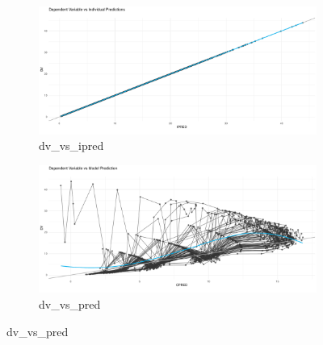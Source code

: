 \begin{figure}[htbp]
    \begin{subfigure}[b]{0.45\linewidth}
        \centering
        \includegraphics[width=\linewidth]{fig/img/Xpose/dv_vs_ipred.pdf}
        \caption{dv\_vs\_ipred}
        \label{fig:dv_vs_ipred}
    \end{subfigure}
    \hfill
    \begin{subfigure}[b]{0.45\linewidth}
        \centering
        \includegraphics[width=\linewidth]{fig/img/Xpose/dv_vs_pred.pdf}
        \caption{dv\_vs\_pred}
        \label{fig:dv_vs_pred}
    \end{subfigure}

    \vspace{1em}


\end{figure}
